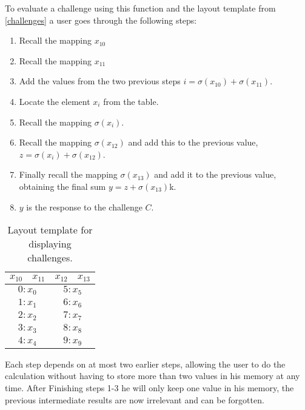 To evaluate a challenge using this function and the layout template from \autoref{challenges} a user goes through the following steps:
\begin{enumerate}
    \item Recall the mapping $x_{10}$
    \item Recall the mapping $x_{11}$ 
    \item Add the values from the two previous steps $i = \sigma(x_{10}) + \sigma(x_{11})$.
    \item Locate the element $x_i$ from the table.
    \item Recall the mapping $\sigma(x_i)$.
    \item Recall the mapping $\sigma(x_{12})$ and add this to the previous value, $z = \sigma(x_i) + \sigma(x_{12})$.
    \item Finally recall the mapping $\sigma(x_{13})$ and add it to the previous value, obtaining the final sum $y = z + \sigma(x_{13})$k.
    \item $y$ is the response to the challenge $C$.
\end{enumerate}


\begin{table}[h]
    \centering
    \begin{tabular}{|c c|c|c|}
        \hline
        $x_{10}$ & $x_{11}$ & $x_{12}$ & $x_{13}$ \\
        \hline \hline
        \multicolumn{2}{|c|}{$0:x_0$} & \multicolumn{2}{|c|}{$5:x_5$}\\
        \multicolumn{2}{|c|}{$1:x_1$} & \multicolumn{2}{|c|}{$6:x_6$}\\
        \multicolumn{2}{|c|}{$2:x_2$} & \multicolumn{2}{|c|}{$7:x_7$}\\
        \multicolumn{2}{|c|}{$3:x_3$} & \multicolumn{2}{|c|}{$8:x_8$}\\
        \multicolumn{2}{|c|}{$4:x_4$} & \multicolumn{2}{|c|}{$9:x_9$}\\
        \hline 
    \end{tabular}
    \caption{Layout template for displaying challenges.}
    \label{challenges}
\end{table}


\par Each step depends on at most two earlier steps, allowing the user to do the calculation without having to store more than two values in his memory at any time. After Finishing steps 1-3 he will only keep one value in his memory, the previous intermediate results are now irrelevant and can be forgotten. 

